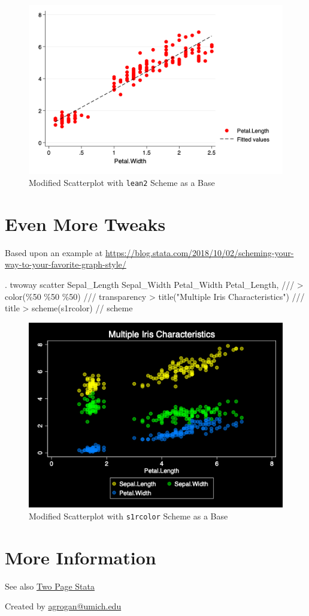 \documentclass[
]{article}
\begin{document}
\begin{figure}
\centering
\includegraphics[width=0.75\linewidth]{lean2Ascatter.png}
\caption{Modified Scatterplot with \texttt{lean2} Scheme as a Base}
\end{figure}

\hypertarget{even-more-tweaks}{%
\section{Even More Tweaks}\label{even-more-tweaks}}

Based upon an example at
\url{https://blog.stata.com/2018/10/02/scheming-your-way-to-your-favorite-graph-style/}

\begin{stlog}
. twoway scatter Sepal_Length Sepal_Width Petal_Width Petal_Length, /// 
> color(\%50 \%50 \%50) /// transparency 
> title("Multiple Iris Characteristics") /// title
> scheme(s1rcolor) // scheme
\end{stlog}



\begin{figure}
\centering
\includegraphics[width=0.75\linewidth]{s1rcolorAscatter.png}
\caption{Modified Scatterplot with \texttt{s1rcolor} Scheme as a Base}
\end{figure}

\hypertarget{more-information}{%
\section{More Information}\label{more-information}}

See also
\href{https://agrogan1.github.io/Stata/two-page-stata/TwoPageStata.pdf}{Two
Page Stata}

Created by \url{agrogan@umich.edu}
\end{document}

